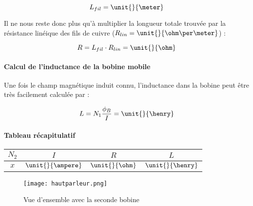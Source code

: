 $$L_{fil} = \unit{}{\meter}$$

Il ne nous reste donc plus qu'à multiplier la longueur totale trouvée par la résistance linéique des fils de cuivre
($R_{lin} = \unit{}{\ohm\per\meter}$) :

$$R = L_{fil} \cdot R_{lin} = \unit{}{\ohm}$$

\paragraph{Calcul de l'inductance de la bobine mobile}

Une fois le champ magnétique induit connu, l'inductance dans la bobine peut être très facilement calculée par :

$$L = N_1 \frac{\phi_B}{I} = \unit{}{\henry}$$

\paragraph{Tableau récapitulatif}

\begin{center}
	\begin{tabular}{c|c|c|c}
		$N_2$ & $I$ & $R$ & $L$ \\
		\hline
		 $x$ & $\unit{}{\ampere}$ & $\unit{}{\ohm}$ & $\unit{}{\henry}$ \\
	\end{tabular}
\end{center}

\begin{figure}[h]
\centering
\texttt{[image: hautparleur.png]}
\caption{Vue d'ensemble avec la seconde bobine}
\label{Vue d'ensemble avec la seconde bobine}
\end{figure}


